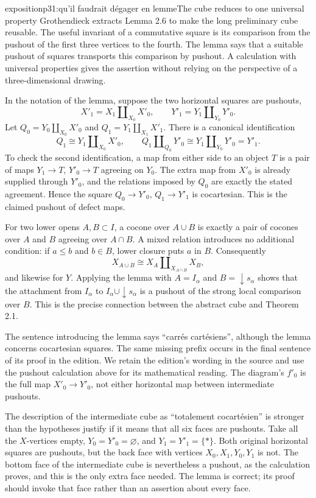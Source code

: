 \begin{dcomment}{exposition}{p31:qu'il faudrait dégager en lemme}{The cube reduces to one universal property}
Grothendieck extracts Lemma 2.6 to make the long preliminary cube reusable. The useful invariant of a commutative square is its comparison from the pushout of the first three vertices to the fourth. The lemma says that a suitable pushout of squares transports this comparison by pushout. A calculation with universal properties gives the assertion without relying on the perspective of a three-dimensional drawing.

In the notation of the lemma, suppose the two horizontal squares are pushouts,
\[
 X'_1=X_1\amalg_{X_0}X'_0,
 \qquad Y'_1=Y_1\amalg_{Y_0}Y'_0.
\]
Let $Q_0=Y_0\amalg_{X_0}X'_0$ and $Q_1=Y_1\amalg_{X_1}X'_1$. There is a canonical identification
\[
 Q_1\cong Y_1\amalg_{X_0}X'_0,
 \qquad Q_1\amalg_{Q_0}Y'_0
       \cong Y_1\amalg_{Y_0}Y'_0=Y'_1.
\]
To check the second identification, a map from either side to an object $T$ is a pair of maps $Y_1\to T$, $Y'_0\to T$ agreeing on $Y_0$. The extra map from $X'_0$ is already supplied through $Y'_0$, and the relations imposed by $Q_0$ are exactly the stated agreement. Hence the square $Q_0\to Y'_0$, $Q_1\to Y'_1$ is cocartesian. This is the claimed pushout of defect maps.

For two lower opens $A,B\subset I$, a cocone over $A\cup B$ is exactly a pair of cocones over $A$ and $B$ agreeing over $A\cap B$. A mixed relation introduces no additional condition: if $a\leq b$ and $b\in B$, lower closure puts $a$ in $B$. Consequently
\[
 X_{A\cup B}\cong X_A\amalg_{X_{A\cap B}}X_B,
\]
and likewise for $Y$. Applying the lemma with $A=I_\alpha$ and $B=\downarrow s_\alpha$ shows that the attachment from $I_\alpha$ to $I_\alpha\cup\downarrow s_\alpha$ is a pushout of the strong local comparison over $B$. This is the precise connection between the abstract cube and Theorem 2.1.

The sentence introducing the lemma says ``carr\'es cart\'esiens'', although the lemma concerns cocartesian squares. The same missing prefix occurs in the final sentence of its proof in the edition. We retain the edition's wording in the source and use the pushout calculation above for its mathematical reading. The diagram's $f'_0$ is the full map $X'_0\to Y'_0$, not either horizontal map between intermediate pushouts.

The description of the intermediate cube as ``totalement cocart\'esien'' is stronger than the hypotheses justify if it means that all six faces are pushouts. Take all the $X$-vertices empty, $Y_0=Y'_0=\varnothing$, and $Y_1=Y'_1=\{*\}$. Both original horizontal squares are pushouts, but the back face with vertices $X_0,X_1,Y_0,Y_1$ is not. The bottom face of the intermediate cube is nevertheless a pushout, as the calculation proves, and this is the only extra face needed. The lemma is correct; its proof should invoke that face rather than an assertion about every face.
\end{dcomment}

